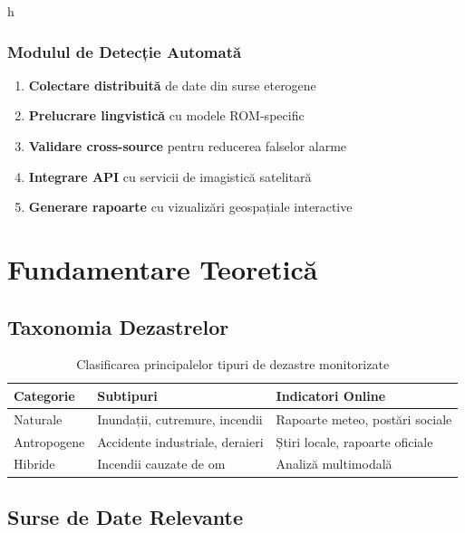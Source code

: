 h\documentclass[12pt,a4paper]{article}
\newcommand{\keyword}[1]{\textbf{#1}}
\begin{document}
\subsubsection{Modulul de Detecție Automată}
\label{subsubsec:modul}

\begin{enumerate}
    \item \keyword{Colectare distribuită} de date din surse eterogene
    \item \keyword{Prelucrare lingvistică} cu modele ROM-specific
    \item \keyword{Validare cross-source} pentru reducerea falselor alarme
    \item \keyword{Integrare API} cu servicii de imagistică satelitară
    \item \keyword{Generare rapoarte} cu vizualizări geospațiale interactive
\end{enumerate}

\section{Fundamentare Teoretică}
\label{sec:fundamentare}

\subsection{Taxonomia Dezastrelor}
\label{subsec:taxonomie}

\begin{table}[h]
    \centering
    \caption{Clasificarea principalelor tipuri de dezastre monitorizate}
    \label{tab:clasificare}
    \begin{tabular}{@{}lll@{}}
        \toprule
        \textbf{Categorie} & \textbf{Subtipuri} & \textbf{Indicatori Online} \\
        \midrule
        Naturale & Inundații, cutremure, incendii & Rapoarte meteo, postări sociale \\
        Antropogene & Accidente industriale, deraieri & Știri locale, rapoarte oficiale \\
        Hibride & Incendii cauzate de om & Analiză multimodală \\
        \bottomrule
    \end{tabular}
\end{table}

\subsection{Surse de Date Relevante}
\label{subsec:surse}
\end{document}
